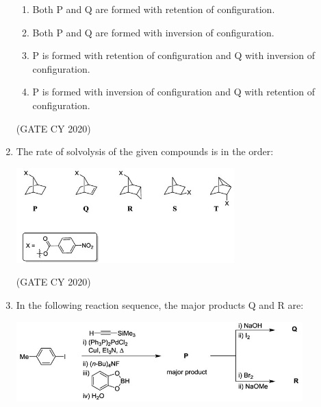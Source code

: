 \documentclass[12pt]{article}
\begin{document}
\begin{enumerate}
\begin{enumerate}
\item Both P and Q are formed with retention of configuration.
\item Both P and Q are formed with inversion of configuration.
\item P is formed with retention of configuration and Q with inversion of configuration.
\item P is formed with inversion of configuration and Q with retention of configuration.
\end{enumerate}
\hfill (GATE CY 2020)

\item The rate of solvolysis of the given compounds is in the order:

\begin{center}
\includegraphics[width=0.6\columnwidth]{figs/q32.png}
 \label{fig:q32}
\end{center}

\begin{enumerate}
\end{enumerate}
\hfill (GATE CY 2020)

\item In the following reaction sequence, the major products Q and R are:

\begin{center}
\includegraphics[width=0.6\columnwidth]{figs/q33.png}
 \label{fig:q33}
\end{center}


\end{enumerate}
\end{document}
